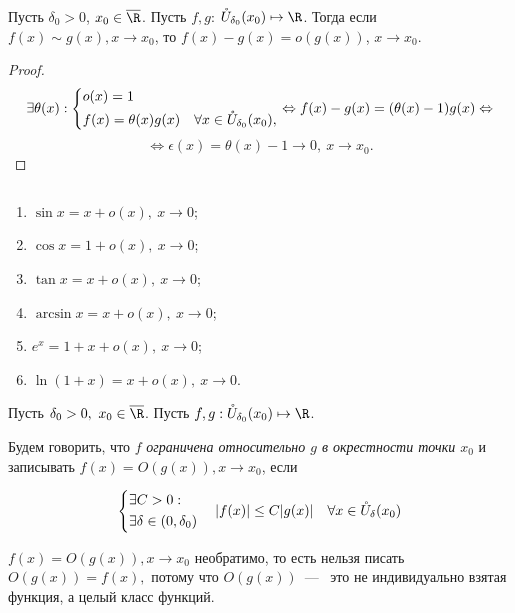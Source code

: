 \begin{lemma}
    Пусть $\delta_{0} > 0$, $x_{0} \in \overline{\R}$. Пусть $f, g$: $\mathring{U}_{\delta_{0}}(x_{0}) \mapsto \R$. Тогда если $f(x) \sim g(x), x\to x_{0}$, то $f(x) - g(x) = o(g(x))$, $x\to x_{0}$.
\end{lemma}
\begin{proof}
    $$\exists \theta(x): \left\{
    \begin{gathered}
        o(x) = 1 \hfill \\
        f(x) = \theta(x) g(x) \quad \forall x\in \mathring{U}_{\delta_{0}}(x_{0}), 
    \end{gathered} \right. \Leftrightarrow f(x) - g(x) = (\theta(x) - 1)g(x) \Leftrightarrow 
    $$
    $$\Leftrightarrow 
    \epsilon(x) = \theta(x) -1 \to 0, \ x\to x_{0}.$$
\end{proof}

\begin{examples} $\ $
        \begin{enumerate}
        \item $\sin x = x + o(x), \ x\to 0$;
        \item $\cos x = 1 + o(x),\ x\to 0$;
        \item $\tan x = x + o(x),\ x \to 0$;
        \item $\arcsin x = x + o(x),\ x \to 0$;
        \item $e^{x} = 1+x + o(x),\ x\to 0$;
        \item $\ln(1+x) = x + o(x),\ x\to 0$.
    \end{enumerate}
\end{examples}

\begin{definition}
     Пусть $\delta_{0} > 0, \ x_{0} \in \overline{\R}$. Пусть $f, g: \mathring{U}_{\delta_{0}}(x_{0}) \mapsto \R$.

     Будем говорить, что $f$ \textit{ограничена относительно $g$ в окрестности точки $x_{0}$} и записывать $f(x) = O(g(x)), x\to x_{0}$, если 

     $$
     \left\{
     \begin{gathered}
         \exists C > 0: \hfill \\
         \exists \delta \in (0, \delta_{0})
     \end{gathered} \right.
     \quad |f(x)| \leq C|g(x)| \quad \forall x\in \mathring{U}_{\delta} (x_{0})
     $$
\end{definition}
\begin{note} 
    $f(x) = O(g(x)), x \to x_{0}$ необратимо, то есть нельзя писать $O(g(x)) = f(x),$ потому что $O(g(x))$~---~ это не индивидуально взятая функция, а целый класс функций. 
\end{note}

